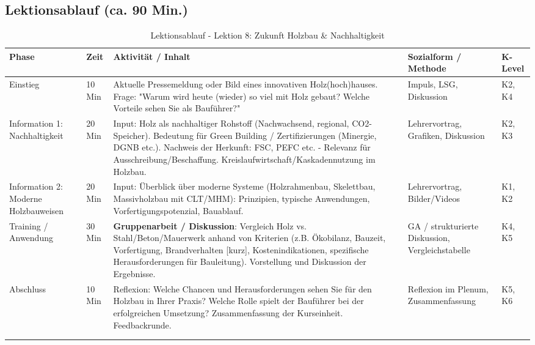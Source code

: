 \documentclass[12pt, a4paper]{article}
\begin{document}
\subsection{Lektionsablauf (ca. 90 Min.)}
\begin{longtable}{|p{}|p{}|>{\raggedright\arraybackslash}p{}|p{}|p{}|}
    \hline
    \textbf{Phase} & \textbf{Zeit} & \textbf{Aktivität / Inhalt} & \textbf{Sozialform / Methode} & \textbf{K-Level} \\
    \hline
    \endhead

    Einstieg & 10 Min & Aktuelle Pressemeldung oder Bild eines innovativen Holz(hoch)hauses. Frage: "Warum wird heute (wieder) so viel mit Holz gebaut? Welche Vorteile sehen Sie als Bauführer?" & Impuls, LSG, Diskussion & K2, K4 \\
    \hline
    Information 1: Nachhaltigkeit & 20 Min & Input: Holz als nachhaltiger Rohstoff (Nachwachsend, regional, CO2-Speicher). Bedeutung für Green Building / Zertifizierungen (Minergie, DGNB etc.). Nachweis der Herkunft: FSC, PEFC etc. - Relevanz für Ausschreibung/Beschaffung. Kreislaufwirtschaft/Kaskadennutzung im Holzbau. & Lehrervortrag, Grafiken, Diskussion & K2, K3 \\
    \hline
    Information 2: Moderne Holzbauweisen & 20 Min & Input: Überblick über moderne Systeme (Holzrahmenbau, Skelettbau, Massivholzbau mit CLT/MHM): Prinzipien, typische Anwendungen, Vorfertigungspotenzial, Bauablauf. & Lehrervortrag, Bilder/Videos & K1, K2 \\
    \hline
    Training / Anwendung & 30 Min & \textbf{Gruppenarbeit / Diskussion}: Vergleich Holz vs. Stahl/Beton/Mauerwerk anhand von Kriterien (z.B. Ökobilanz, Bauzeit, Vorfertigung, Brandverhalten [kurz], Kostenindikationen, spezifische Herausforderungen für Bauleitung). Vorstellung und Diskussion der Ergebnisse. & GA / strukturierte Diskussion, Vergleichstabelle & K4, K5 \\
    \hline
    Abschluss & 10 Min & Reflexion: Welche Chancen und Herausforderungen sehen Sie für den Holzbau in Ihrer Praxis? Welche Rolle spielt der Bauführer bei der erfolgreichen Umsetzung? Zusammenfassung der Kurseinheit. Feedbackrunde. & Reflexion im Plenum, Zusammenfassung & K5, K6 \\
    \hline
    \caption{Lektionsablauf - Lektion 8: Zukunft Holzbau \& Nachhaltigkeit} \\
    \label{tab:lektion8-bf}
\end{longtable}
\end{document}

